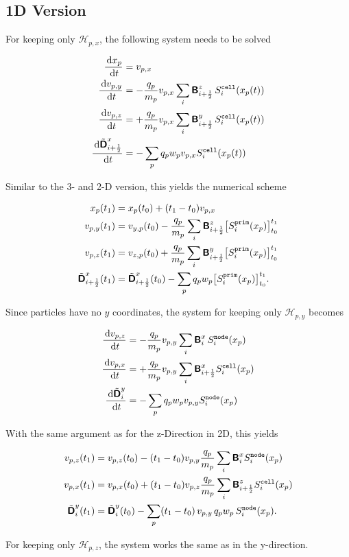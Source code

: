 \documentclass[11pt]{article}
\newcommand{\cell}{\texttt{cell}}
\newcommand{\node}{\texttt{node}}
\newcommand{\prim}{\texttt{prim}}
\begin{document}
\subsection{1D Version}
For keeping only $\mathcal{H}_{p,x}$, the following system needs to be solved

$$
\begin{aligned}
    \fract{x_p}{t} &= v_{p,x} \\
    \fract{v_{p,y}}{t} &= -\frac{q_p}{m_p} v_{p,x} \sum_{i} \arrB^{z}_{\iph} \,S^\cell_i(x_p(t))\\
    \fract{v_{p,z}}{t} &= +\frac{q_p}{m_p} v_{p,x} \sum_{i} \arrB^{y}_{\iph} \,S^\cell_i(x_p(t))\\
    \fract{\tilde{\arrD}^{x}_{\iph}}{t} &= - \sum_p q_p w_p v_{p,x} S^\cell_i(x_p(t)) 
\end{aligned}
$$

Similar to the 3- and 2-D version, this yields the numerical scheme

$$
\begin{aligned}
    x_p&(t_1) = x_p(t_0) + (t_1-t_0) v_{p,x} \\
    v_{p, y}&(t_1) = v_{y,p}(t_0) -  
    \frac{q_p}{m_p} \sum_{i} \arrB^{z}_{\iph} \big[S^\prim_i(x_p)\big]_{t_0}^{t_1}    
    \\
    v_{p, z}&(t_1) =  v_{z,p}(t_0) + 
    \frac{q_p}{m_p} \sum_{i} \arrB^{y}_{\iph} \big[S^\prim_i(x_p)\big]_{t_0}^{t_1}  
    \\
    \tilde{\arrD}^{x}_{\iph} & (t_1) =  \tilde{\arrD}^{x}_{\iph}(t_0) - 
    \sum_p q_p w_p \big[S^\prim_i(x_p)\big]_{t_0}^{t_1} .
\end{aligned}
$$

Since particles have no $y$ coordinates, the system for keeping only $\mathcal{H}_{p,y}$ becomes

$$
\begin{aligned}
    \fract{v_{p,z}}{t} &= -\frac{q_p}{m_p} v_{p,y} \sum_{i} \arrB^{x}_{i} \,S^\node_i(x_p)\\
    \fract{v_{p,x}}{t} &= +\frac{q_p}{m_p} v_{p,y} \sum_{i} \arrB^{x}_{\iph} S^\cell_i(x_p)\\
    \fract{\tilde{\arrD}^{y}_{i}}{t} &= - \sum_p q_p w_p v_{p,y} S^\node_i(x_p)  
\end{aligned}
$$

With the same argument as for the z-Direction in 2D, this yields

$$
\begin{aligned}
    v_{p,z}&(t_1) = v_{p,z}(t_0) -  
    (t_1 - t_0) v_{p,y} \frac{q_p}{m_p} \sum_{i} \arrB^{x}_{i} S^\node_i(x_p)     
    \\
    v_{p,x}&(t_1) =  v_{p,x}(t_0) + 
    (t_1 - t_0) v_{p,z} \frac{q_p}{m_p} \sum_{i} \arrB^{z}_{\iph} S^\cell_i(x_p)   
    \\
    \tilde{\arrD}^{y}_{i} & (t_1) =  \tilde{\arrD}^{y}_{i}(t_0) - 
    \sum_p (t_1 - t_0) \, v_{p,y} \,q_p w_p \,S^\node_i(x_p).
\end{aligned}
$$

For keeping only $\mathcal{H}_{p,z}$, the system works the same as in the y-direction.
\end{document}
